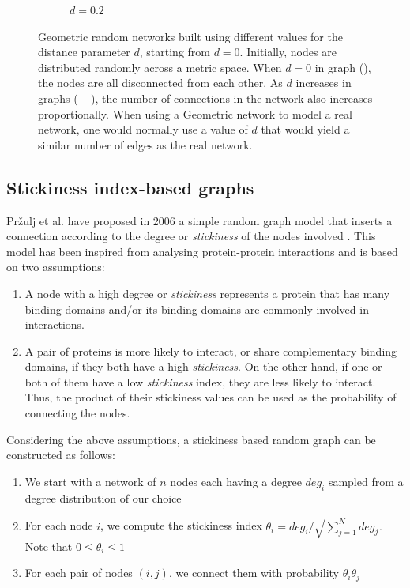 \begin{figure}[H]
\begin{subfigure}[b]{0.45\textwidth}
    \caption{$d = 0.2$}
    \label{fig:geo4}    
   \end{subfigure}
   \caption[Geometric random graphs]{Geometric random networks built using different values for the distance parameter $d$, starting from
$d = 0$. Initially, nodes are distributed randomly across a metric space. When $d = 0$ in graph (), the nodes are all disconnected from each other. As $d$ increases in graphs ( -- ), the number of connections in the network also increases proportionally. When using a Geometric network to model a real network, one would normally use a value of $d$ that would yield a similar number of edges as the real network.}
   \label{fig:geometric} 
\end{figure}


\subsection{Stickiness index-based graphs}

Pr\v{z}ulj et al. have proposed in 2006 a simple random
graph model that inserts a connection according to the degree or \emph{stickiness}
of the nodes involved \cite{prvzulj2006modelling}. This model has been inspired
from analysing protein-protein interactions and is based on two assumptions:
\begin{enumerate}
 \item A node with a high degree or \emph{stickiness} represents a protein that has many binding domains and/or its binding domains are
commonly involved in interactions.
 \item A pair of proteins is more likely to interact, or share complementary
binding domains, if they both have a high \emph{stickiness}. On the other hand,
if one or both of them have a low \emph{stickiness} index, they are less likely to
interact. Thus, the product of their stickiness values can be used as the
probability of connecting the nodes.
\end{enumerate}

Considering the above assumptions, a stickiness based random graph can be
constructed as follows:
\begin{enumerate}
 \item We start with a network of $n$ nodes each having a degree $ deg_i $
sampled from a degree distribution of our choice
 \item For each node $i$, we compute the stickiness index $
\theta_i=deg_i/\sqrt{\sum_{j=1}^{N}deg_j}. $ Note that $ 0 \leq \theta_i \leq 1$
 \item For each pair of nodes $(i,j)$, we connect them with probability $
\theta_i \theta_j $
\end{enumerate}


